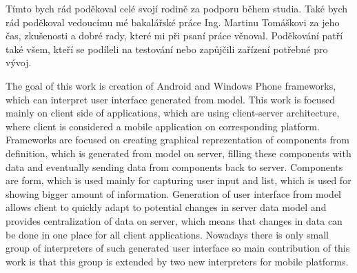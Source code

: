 \documentclass[11pt,twoside,a4paper]{book}
\begin{document}
	\coverpagestarts


	\acknowledgements
	\noindent
	Tímto bych rád poděkoval celé svojí rodině za podporu během studia. Také bych rád poděkoval vedoucímu mé bakalářské práce Ing. Martinu Tomáškovi za jeho čas, zkušenosti a dobré rady, které mi při psaní práce věnoval. Poděkování patří také všem, kteří se podíleli na testování nebo zapůjčili zařízení potřebné pro vývoj.





 
	\abstractpage

	The goal of this work is creation of Android and Windows Phone frameworks, which can interpret user interface generated from model. This work is focused mainly on client side of applications, which are using client-server architecture, where client is considered a mobile application on corresponding platform. Frameworks are focused on creating graphical reprezentation of components from definition, which is generated from model on server, filling these components with data and eventually sending data from components back to server. Components are form, which is used mainly for capturing user input and list, which is used for showing bigger amount of information. Generation of user interface from model allows client to quickly adapt to potential changes in server data model and provides centralization of data on server, which means that changes in data can be done in one place for all client applications. Nowadays there is only small group of interpreters of such generated user interface so main contribution of this work is that this group is extended by two new interpreters for mobile platforms.


	\baselineskip
\end{document}
